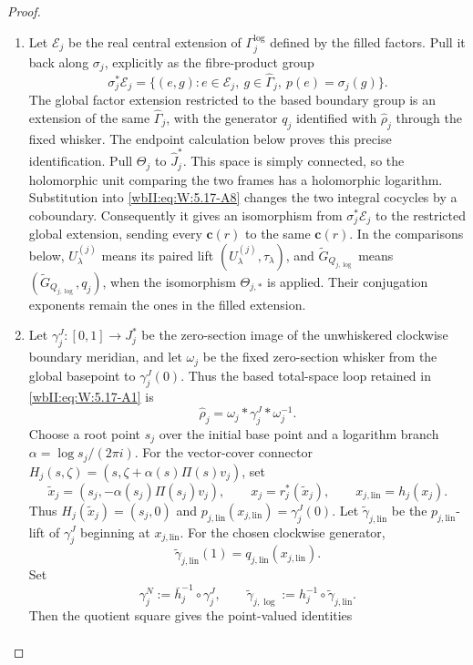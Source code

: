 \begin{proof}
\begin{enumerate}[label=\arabic*.,leftmargin=*]
\item Let \(\mathscr E_j\) be the real central extension of
\(\Gamma_j^{\log}\) defined by the filled factors.  Pull it back along
\(\sigma_j\), explicitly as the fibre-product group
\[
 \sigma_j^*\mathscr E_j=
 \{(e,g):e\in\mathscr E_j,\ g\in\widehat\Gamma_j,
           \ p(e)=\sigma_j(g)\}.
\]
The global factor extension restricted to the based boundary group is
an extension of the same \(\widehat\Gamma_j\), with the generator
\(q_j\) identified with \(\widehat\rho_j\) through the fixed whisker.
The endpoint calculation below proves this precise identification.
Pull \(\Theta_j\) to \(\widehat J_j^*\).  This space is simply
connected, so the holomorphic unit comparing the two frames has a
holomorphic logarithm.  Substitution into \eqref{wbII:eq:W:5.17-A8}
changes the two integral cocycles by a coboundary.  Consequently it gives
an isomorphism from \(\sigma_j^*\mathscr E_j\) to the restricted global
extension, sending every \(\mathbf c(r)\) to the same
\(\mathbf c(r)\).  In the comparisons below,
\(U_\lambda^{(j)}\) means its paired lift
\((U_\lambda^{(j)},\tau_\lambda)\), and
\(\widetilde G_{Q_{j,\log}}\) means
\((\widetilde G_{Q_{j,\log}},q_j)\), when the isomorphism
\(\Theta_{j,*}\) is applied.  Their conjugation exponents remain the
ones in the filled extension.  
\item Let \(\gamma_j^J:[0,1]\to J_j^*\) be the zero-section image of the
unwhiskered clockwise boundary meridian, and let \(\omega_j\) be the fixed
zero-section whisker from the global basepoint to \(\gamma_j^J(0)\).  Thus
the based total-space loop retained in \eqref{wbII:eq:W:5.17-A1} is
\[
 \widehat\rho_j=\omega_j*\gamma_j^J*\omega_j^{-1}.
\]
Choose a root point $s_j$ over the initial base point and a logarithm
branch $\alpha=\log s_j/(2\pi i)$.  For the vector-cover connector
$H_j(s,\zeta)=(s,\zeta+\alpha(s)\Pi(s)v_j)$, set
\[
 \widetilde x_j=(s_j,-\alpha(s_j)\Pi(s_j)v_j),\qquad
 x_j=r_j^*(\widetilde x_j),\qquad x_{j,\mathrm{lin}}=h_j(x_j).
\]
Thus $H_j(\widetilde x_j)=(s_j,0)$ and
$p_{j,\mathrm{lin}}(x_{j,\mathrm{lin}})=\gamma_j^J(0)$.  Let
\(\widetilde\gamma_{j,\mathrm{lin}}\) be the
\(p_{j,\mathrm{lin}}\)-lift of \(\gamma_j^J\) beginning at
\(x_{j,\mathrm{lin}}\).  For the chosen clockwise generator,
\[
 \widetilde\gamma_{j,\mathrm{lin}}(1)
 =q_{j,\mathrm{lin}}(x_{j,\mathrm{lin}}).
\]
Set
\[
 \gamma_j^N:=\bar h_j^{-1}\circ\gamma_j^J,
 \qquad
 \widetilde\gamma_{j,\log}
 :=h_j^{-1}\circ\widetilde\gamma_{j,\mathrm{lin}}.
\]
Then the quotient square gives the point-valued identities
\[
\begin{aligned}

\end{aligned}\]
\end{enumerate}
\end{proof}
